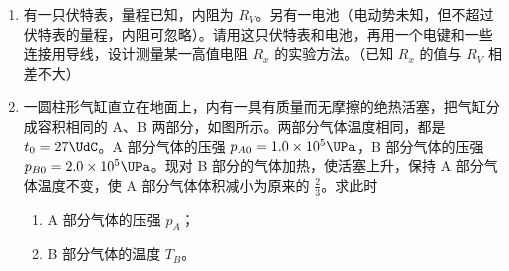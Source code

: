 \documentclass[\gkver]{gaokaozhenti}
\begin{document}
\begin{enumerate}
{\begin{enumerate}
	\item
	④$n = \frac{\sin i}{\sin r}$

\end{enumerate}
}

\item
有一只伏特表，量程已知，内阻为 $R_{V}$。另有一电池（电动势未知，但不超过伏特表的量程，内阻可忽略）。请用这只伏特表和电池，再用一个电键和一些连接用导线，设计测量某一高值电阻 $R_{x}$ 的实验方法。（已知 $R_{x}$ 的值与 $R_{V}$ 相差不大）

\item
一圆柱形气缸直立在地面上，内有一具有质量而无摩擦的绝热活塞，把气缸分成容积相同的 A、B 两部分，如图所示。两部分气体温度相同，都是 $t_{0} = 27\UdC$。A 部分气体的压强 $p_{A0} = 1.0\times10^{5}\UPa$，B 部分气体的压强 $p_{B0} = 2.0\times10^{5}\UPa$。现对 B 部分的气体加热，使活塞上升，保持 A 部分气体温度不变，使 A 部分气体体积减小为原来的 $\frac{2}{3}$。求此时
\begin{enumerate}
	\item
	A 部分气体的压强 $p_{A}$；
	\item
	B 部分气体的温度 $T_{B}$。
\end{enumerate}
\onepicture[align=right, w=2.88cm]{}
\end{enumerate}
\end{document}
